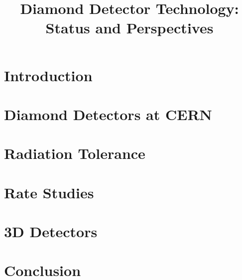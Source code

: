 \documentclass{PoS}
\title{Diamond Detector Technology: Status and Perspectives}
\begin{document}
\section{Introduction}


\section{Diamond Detectors at CERN}


\section{Radiation Tolerance}\label{rad}


\section{Rate Studies}


\section{3D Detectors}\label{3D}


\section{Conclusion}




\newpage


\end{document}

